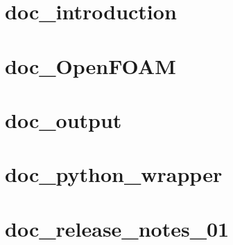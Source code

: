 \documentclass[twoside]{book}
\newcommand{\+}{\discretionary{\mbox{\scriptsize$\hookleftarrow$}}{}{}}
\begin{document}
\chapter{doc\+\_\+introduction}
\label{md__home_carlo_data_GeN-Foam_GeN-Foam_ffn_GeN-Foam_GeN-Foam_FMU4FOAM_ECI4FOAM_docs_pages_doc_doc_introduction}

\chapter{doc\+\_\+\+Open\+F\+O\+AM}
\label{md__home_carlo_data_GeN-Foam_GeN-Foam_ffn_GeN-Foam_GeN-Foam_FMU4FOAM_ECI4FOAM_docs_pages_doc_doc_OpenFOAM}

\chapter{doc\+\_\+output}
\label{md__home_carlo_data_GeN-Foam_GeN-Foam_ffn_GeN-Foam_GeN-Foam_FMU4FOAM_ECI4FOAM_docs_pages_doc_doc_output}

\chapter{doc\+\_\+python\+\_\+wrapper}
\label{md__home_carlo_data_GeN-Foam_GeN-Foam_ffn_GeN-Foam_GeN-Foam_FMU4FOAM_ECI4FOAM_docs_pages_doc_doc_python_wrapper}

\chapter{doc\+\_\+release\+\_\+notes\+\_\+01}
\label{md__home_carlo_data_GeN-Foam_GeN-Foam_ffn_GeN-Foam_GeN-Foam_FMU4FOAM_ECI4FOAM_docs_pages_doc_doc_release_notes_01}

\end{document}
